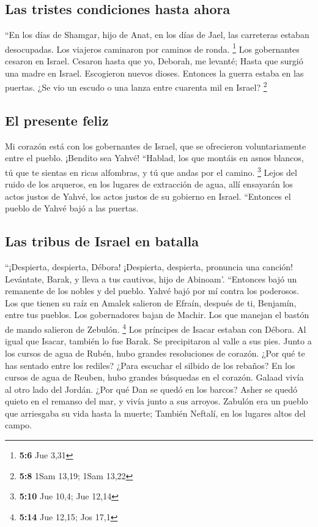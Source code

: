 \hypertarget{las-tristes-condiciones-hasta-ahora}{%
\subsection{Las tristes condiciones hasta
ahora}\label{las-tristes-condiciones-hasta-ahora}}

 ``En los días de Shamgar, hijo de Anat, en los días de
Jael, las carreteras estaban desocupadas. Los viajeros caminaron por
caminos de ronda. \footnote{\textbf{5:6} Jue 3,31}  Los
gobernantes cesaron en Israel. Cesaron hasta que yo, Deborah, me
levanté; Hasta que surgió una madre en Israel.  Escogieron
nuevos dioses. Entonces la guerra estaba en las puertas. ¿Se vio un
escudo o una lanza entre cuarenta mil en Israel? \footnote{\textbf{5:8}
  1Sam 13,19; 1Sam 13,22}

\hypertarget{el-presente-feliz}{%
\subsection{El presente feliz}\label{el-presente-feliz}}

 Mi corazón está con los gobernantes de Israel, que se
ofrecieron voluntariamente entre el pueblo. ¡Bendito sea Yahvé!
 ``Hablad, los que montáis en asnos blancos, tú que te
sientas en ricas alfombras, y tú que andas por el camino. \footnote{\textbf{5:10}
  Jue 10,4; Jue 12,14}  Lejos del ruido de los arqueros,
en los lugares de extracción de agua, allí ensayarán los actos justos de
Yahvé, los actos justos de su gobierno en Israel. ``Entonces el pueblo
de Yahvé bajó a las puertas.

\hypertarget{las-tribus-de-israel-en-batalla}{%
\subsection{Las tribus de Israel en
batalla}\label{las-tribus-de-israel-en-batalla}}

 ``¡Despierta, despierta, Débora! ¡Despierta, despierta,
pronuncia una canción! Levántate, Barak, y lleva a tus cautivos, hijo de
Abinoam'.  ``Entonces bajó un remanente de los nobles y
del pueblo. Yahvé bajó por mí contra los poderosos.  Los
que tienen su raíz en Amalek salieron de Efraín, después de ti,
Benjamín, entre tus pueblos. Los gobernadores bajan de Machir. Los que
manejan el bastón de mando salieron de Zebulón. \footnote{\textbf{5:14}
  Jue 12,15; Jos 17,1}  Los príncipes de Isacar estaban
con Débora. Al igual que Isacar, también lo fue Barak. Se precipitaron
al valle a sus pies. Junto a los cursos de agua de Rubén, hubo grandes
resoluciones de corazón.  ¿Por qué te has sentado entre
los rediles? ¿Para escuchar el silbido de los rebaños? En los cursos de
agua de Reuben, hubo grandes búsquedas en el corazón. 
Galaad vivía al otro lado del Jordán. ¿Por qué Dan se quedó en los
barcos? Asher se quedó quieto en el remanso del mar, y vivía junto a sus
arroyos.  Zabulón era un pueblo que arriesgaba su vida
hasta la muerte; También Neftalí, en los lugares altos del campo.

